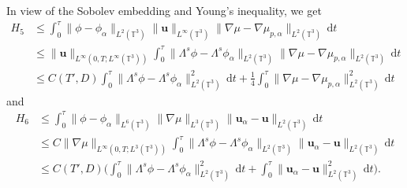 \documentclass[reqno,a4paper,11pt]{amsart}
\theoremstyle{plain}
\numberwithin{equation}{section}
\newcommand{\bb}[1]{\mathbb{#1}}
\newcommand{\bbt}{\bb{T}}
\renewcommand{\d}{\mathrm{d}}
\newcommand{\dt}{\d t}
\begin{document}
				In view of the Sobolev embedding and Young's inequality, we get
				\begin{align}
					\label{mode54-227}
					\nonumber H_{5}
					& \leq\int_0^\tau\|\phi-\phi_{\alpha}\|_{L^{2}(\mathbb{T}^{3})}\|\mathbf{u}\|_{L^{\infty}(\mathbb{T}^{3})}
					\|\nabla\mu-\nabla\mu_{p,\alpha}\|_{L^{2}(\mathbb{T}^{3})}\,\dt
					\\&\leq \nonumber \|\mathbf{u}\|_{L^{\infty}(0,T;L^{\infty}(\mathbb{T}^{3}))}\int_0^\tau\|\Lambda^s\phi-\Lambda^s\phi_{\alpha}\|_{L^{2}(\mathbb{T}^{3})}\|\nabla\mu-\nabla\mu_{p,\alpha}\|_{L^{2}(\mathbb{T}^{3})}\,\dt
					\\&\leq  C(T',D)\int_0^\tau\|\Lambda^s\phi-\Lambda^s\phi_{\alpha}\|_{L^{2}(\bbt^3)}^2 \,\dt+
					\frac{1}{4}\int_0^\tau\|\nabla\mu-\nabla\mu_{p,\alpha}\|_{L^{2}(\mathbb{T}^{3})}^{2}\,\dt
				\end{align}
				and
				\begin{align}
					\label{mode54-228}
					\nonumber H_{6}
					&\leq\int_0^\tau\|\phi-\phi_{\alpha}\|_{L^{6}(\mathbb{T}^{3})}\|\nabla\mu\|_{L^{3}(\mathbb{T}^{3})}\|\mathbf{u}_{\alpha}-\mathbf{u}\|_{L^{2}(\mathbb{T}^{3})}\,\dt
					\\&\leq\nonumber C\|\nabla\mu\|_{L^{\infty}(0,T;L^{3}(\mathbb{T}^{3}))}\int_0^\tau\|\Lambda^s\phi-\Lambda^s\phi_{\alpha}\|_{L^{2}(\bbt^3)}\|\mathbf{u}_{\alpha}-\mathbf{u}\|_{L^{2}(\mathbb{T}^{3})}\,\dt
					\\&\leq C(T',D)\bigg(\int_0^\tau\|\Lambda^s\phi-\Lambda^s\phi_{\alpha}\|_{L^{2}(\bbt^3)}^2\,\dt
					+\int_0^\tau\|\mathbf{u}_{\alpha}-\mathbf{u}\|_{L^{2}(\mathbb{T}^{3})}^{2}\,\dt\bigg).
				\end{align}
				
\end{document}
